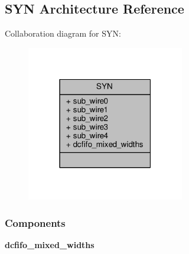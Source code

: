 \subsection{S\+YN Architecture Reference}
\label{classfpga__outfifo_1_1SYN}


Collaboration diagram for S\+YN\+:\nopagebreak
\begin{figure}[H]
\begin{center}
\leavevmode
\includegraphics[width=195pt]{d7/d97/classfpga__outfifo_1_1SYN__coll__graph}
\end{center}
\end{figure}
\subsubsection*{Components}
 \begin{DoxyCompactItemize}
\item 
{\bf dcfifo\+\_\+mixed\+\_\+widths}  {\bfseries }  
\end{DoxyCompactItemize}
